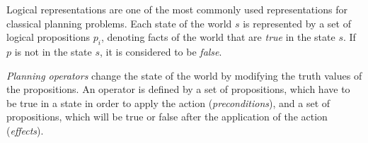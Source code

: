 


Logical representations are one of the most commonly used representations for classical planning problems. 
Each state of the world $s$ is represented by a set of logical propositions $p_i$, denoting facts of the world that are \textit{true} in the state $s$. 
If $p$ is not in the state $s$, it is considered to be \textit{false}.

\textit{Planning operators} change the state of the world by modifying the truth values of the propositions. 
An operator is defined by a set of propositions, which have to be true in a state in order to apply the action (\textit{preconditions}), and a set of propositions, which will be true or false after the application of the action (\textit{effects}).

